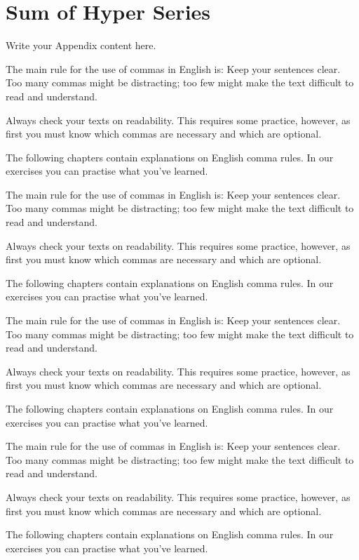 \chapter{Sum of Hyper Series} 
\label{AppendixB} 


Write your Appendix content here.

The main rule for the use of commas in English is: Keep your sentences clear. Too many commas might be distracting; too few might make the text difficult to read and understand.

Always check your texts on readability. This requires some practice, however, as first you must know which commas are necessary and which are optional.

The following chapters contain explanations on English comma rules. In our exercises you can practise what you've learned.



The main rule for the use of commas in English is: Keep your sentences clear. Too many commas might be distracting; too few might make the text difficult to read and understand.

Always check your texts on readability. This requires some practice, however, as first you must know which commas are necessary and which are optional.

The following chapters contain explanations on English comma rules. In our exercises you can practise what you've learned.



The main rule for the use of commas in English is: Keep your sentences clear. Too many commas might be distracting; too few might make the text difficult to read and understand.

Always check your texts on readability. This requires some practice, however, as first you must know which commas are necessary and which are optional.

The following chapters contain explanations on English comma rules. In our exercises you can practise what you've learned.


The main rule for the use of commas in English is: Keep your sentences clear. Too many commas might be distracting; too few might make the text difficult to read and understand.

Always check your texts on readability. This requires some practice, however, as first you must know which commas are necessary and which are optional.

The following chapters contain explanations on English comma rules. In our exercises you can practise what you've learned.



